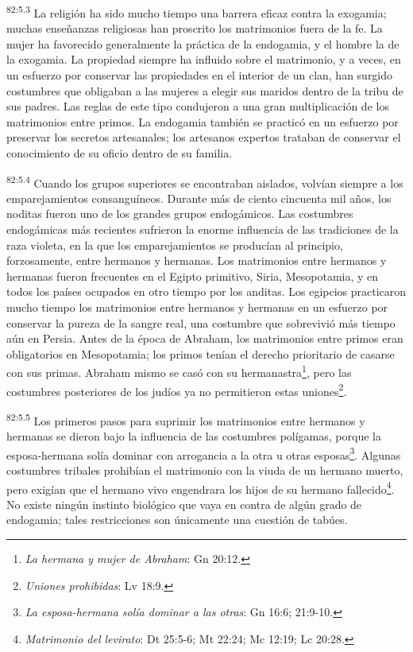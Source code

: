 \documentclass[twoside, 11pt]{book}
\begin{document}
\par
\textsuperscript{82:5.3} La religión ha sido mucho tiempo una barrera eficaz contra la exogamia; muchas enseñanzas religiosas han proscrito los matrimonios fuera de la fe. La mujer ha favorecido generalmente la práctica de la endogamia, y el hombre la de la exogamia. La propiedad siempre ha influido sobre el matrimonio, y a veces, en un esfuerzo por conservar las propiedades en el interior de un clan, han surgido costumbres que obligaban a las mujeres a elegir sus maridos dentro de la tribu de sus padres. Las reglas de este tipo condujeron a una gran multiplicación de los matrimonios entre primos. La endogamia también se practicó en un esfuerzo por preservar los secretos artesanales; los artesanos expertos trataban de conservar el conocimiento de su oficio dentro de su familia.

\par
\textsuperscript{82:5.4} Cuando los grupos superiores se encontraban aislados, volvían siempre a los emparejamientos consanguíneos. Durante más de ciento cincuenta mil años, los noditas fueron uno de los grandes grupos endogámicos. Las costumbres endogámicas más recientes sufrieron la enorme influencia de las tradiciones de la raza violeta, en la que los emparejamientos se producían al principio, forzosamente, entre hermanos y hermanas. Los matrimonios entre hermanos y hermanas fueron frecuentes en el Egipto primitivo, Siria, Mesopotamia, y en todos los países ocupados en otro tiempo por los anditas. Los egipcios practicaron mucho tiempo los matrimonios entre hermanos y hermanas en un esfuerzo por conservar la pureza de la sangre real, una costumbre que sobrevivió más tiempo aún en Persia. Antes de la época de Abraham, los matrimonios entre primos eran obligatorios en Mesopotamia; los primos tenían el derecho prioritario de casarse con sus primas. Abraham mismo se casó con su hermanastra\footnote{\textit{La hermana y mujer de Abraham}: Gn 20:12.}, pero las costumbres posteriores de los judíos ya no permitieron estas uniones\footnote{\textit{Uniones prohibidas}: Lv 18:9.}.

\par
\textsuperscript{82:5.5} Los primeros pasos para suprimir los matrimonios entre hermanos y hermanas se dieron bajo la influencia de las costumbres polígamas, porque la esposa-hermana solía dominar con arrogancia a la otra u otras esposas\footnote{\textit{La esposa-hermana solía dominar a las otras}: Gn 16:6; 21:9-10.}. Algunas costumbres tribales prohibían el matrimonio con la viuda de un hermano muerto, pero exigían que el hermano vivo engendrara los hijos de su hermano fallecido\footnote{\textit{Matrimonio del levirato}: Dt 25:5-6; Mt 22:24; Mc 12:19; Lc 20:28.}. No existe ningún instinto biológico que vaya en contra de algún grado de endogamia; tales restricciones son únicamente una cuestión de tabúes.
\end{document}

